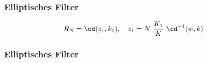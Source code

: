 \documentclass[ngerman, aspectratio=169, xcolor={rgb}]{beamer}
\begin{document}
	\begin{frame}
		\frametitle{Elliptisches Filter}

		\begin{equation*}
			R_N = \cd(z_1, k_1),
			\quad
			z_1 = N~\frac{K_1}{K}~\cd^{-1}(w, k)
		\end{equation*}

		\begin{center}
			\scalebox{0.75}{
				
			}
		\end{center}

	\end{frame}


	\begin{frame}
		\frametitle{Elliptisches Filter}

		\begin{columns}

			\begin{column}[T]{0.5\textwidth}

				\begin{center}
					\resizebox{\textwidth}{!}{
					
					}
				\end{center}

			\end{column}
			\begin{column}[T]{0.5\textwidth}

				\begin{center}
					\resizebox{\textwidth}{!}{
					
					}
				\end{center}

			\end{column}
		\end{columns}

	\end{frame}

	
\end{document}
